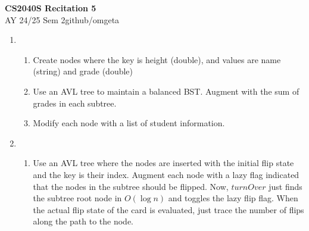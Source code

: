 \documentclass[12pt, a4paper]{article}
\newcommand{\mytitle}{CS2040S Recitation 5}
\newcommand{\myauthor}{github/omgeta}
\newcommand{\mydate}{AY 24/25 Sem 2}
\begin{document}
\raggedright
\footnotesize
\begin{center}
{\normalsize{\textbf{\mytitle}}} \\
{\footnotesize{\mydate\hspace{2pt}\textemdash\hspace{2pt}\myauthor}}
\end{center}
\begin{enumerate}[Q\arabic*.]
  \item 
    \begin{enumerate}[(\alph*.)]
      \item Create nodes where the key is height (double), and values are name (string) and grade (double) 

      \item Use an AVL tree to maintain a balanced BST. Augment with the sum of grades in each subtree. 

      \item Modify each node with a list of student information.
    \end{enumerate}

  \item 
    \begin{enumerate}[(\alph*.)]
      \item Use an AVL tree where the nodes are inserted with the initial flip state and the key is their index. Augment each node with a lazy flag indicated that the nodes in the subtree should be flipped. Now, $turnOver$ just finds the subtree root node in $O(\log n)$ and toggles the lazy flip flag. When the actual flip state of the card is evaluated, just trace the number of flips along the path to the node.
    \end{enumerate}
\end{enumerate}
\end{document}
